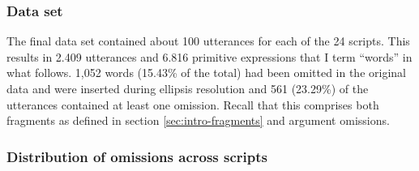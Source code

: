 \subsubsection{Data set}
\label{sec:scripts-production-results-dataset}
The final data set contained about 100 utterances for each of the 24 scripts. This results in 2.409 utterances and 6.816 primitive expressions that I term ``words'' in what follows. 1,052 words (15.43\% of the total) had been omitted in the original data and were inserted during ellipsis resolution and 561 (23.29\%) of the utterances contained at least one omission. Recall that this comprises both fragments as defined in section \ref{sec:intro-fragments} and argument omissions.

\subsubsection{Distribution of omissions across scripts}

